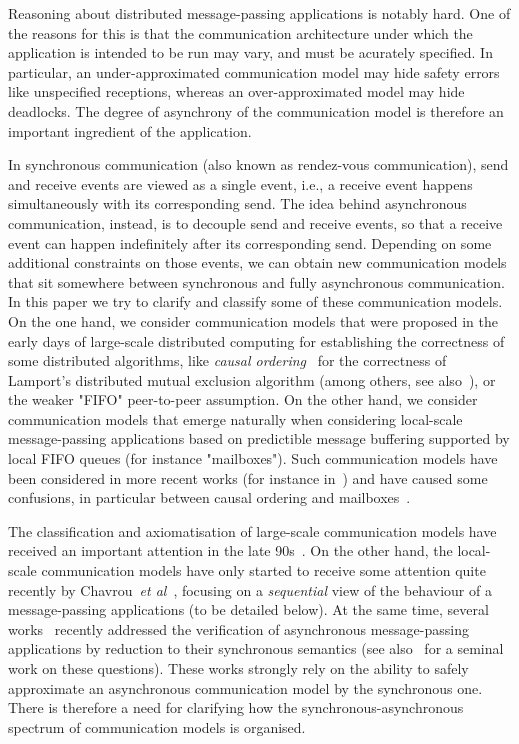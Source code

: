 

Reasoning about distributed message-passing applications is notably hard. One of the reasons for this
is that the communication architecture under which the application is intended to be run may vary, and must be acurately specified. In particular, an under-approximated communication model may hide safety errors
like unspecified receptions, whereas an over-approximated model may hide deadlocks. The degree of asynchrony
of the communication model is therefore an important ingredient of the application.

In synchronous communication (also known as rendez-vous communication), send and receive events are viewed as
a single event, i.e., a receive event happens simultaneously with its corresponding send. The idea behind asynchronous communication, instead, is to decouple send and receive events, so that a receive event can happen indefinitely after its corresponding send. Depending on some additional constraints on those events, we can obtain new communication models that sit somewhere between synchronous and fully asynchronous communication.
In this paper we try to clarify and classify some of these communication models.
On the one hand, we consider communication models that were proposed in the early days of large-scale distributed computing for establishing the correctness of some distributed algorithms, like \emph{causal ordering}~\cite{Lamport78} for the correctness of Lamport's distributed mutual exclusion algorithm (among others, see also~\cite{Renesse93}), or the weaker "FIFO" peer-to-peer assumption. On the other hand, we consider communication models that emerge
naturally when considering local-scale message-passing applications based on predictible
message buffering supported by local FIFO queues (for instance "mailboxes"). Such communication models have
been considered in more recent works (for instance in~\cite{DBLP:journals/tcs/BasuB16}) and have caused
some confusions, in particular between causal ordering and mailboxes~\cite{DBLP:conf/cav/BouajjaniEJQ18,DBLP:conf/fossacs/GiustoLL20}.

The classification and axiomatisation of large-scale communication models have received an important attention in the late 90s~\cite{DBLP:journals/dc/Charron-BostMT96}. On the other hand, the local-scale communication models
have only started to receive some attention quite recently by Chavrou~\emph{et al}~\cite{DBLP:journals/fac/ChevrouHQ16}, focusing on a \emph{sequential} view of the behaviour of a message-passing
applications (to be detailed below).
At the same time, several works~\cite{KraglQH18,GleissenthallKB19,DBLP:conf/cav/BouajjaniEJQ18,DBLP:conf/cav/LangeY19} recently addressed the verification of
asynchronous message-passing applications by reduction to their synchronous semantics (see also~\cite{Lipton75} for a seminal work on these questions). These works strongly rely on the ability to safely approximate an asynchronous communication model by the synchronous one. There is therefore a need for clarifying how the synchronous-asynchronous spectrum of communication models is organised.

